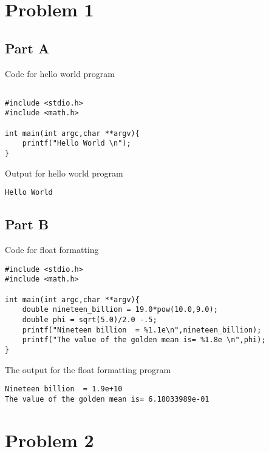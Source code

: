 \documentclass[12pt]{article}
\begin{document}

\section{Problem 1}
\subsection{Part A}
Code for hello world program
\begin{verbatim}

#include <stdio.h>
#include <math.h>

int main(int argc,char **argv){
	printf("Hello World \n");
}

\end{verbatim}
Output for hello world program
\begin{verbatim}
Hello World 
\end{verbatim}

\subsection{Part B}
Code for float formatting
\begin{verbatim}
#include <stdio.h>
#include <math.h>

int main(int argc,char **argv){
	double nineteen_billion = 19.0*pow(10.0,9.0);
	double phi = sqrt(5.0)/2.0 -.5;
	printf("Nineteen billion  = %1.1e\n",nineteen_billion);
	printf("The value of the golden mean is= %1.8e \n",phi);
}

\end{verbatim}
The output for the float formatting program
\begin{verbatim}
Nineteen billion  = 1.9e+10
The value of the golden mean is= 6.18033989e-01 
\end{verbatim}

\section{Problem 2}
\end{document}
